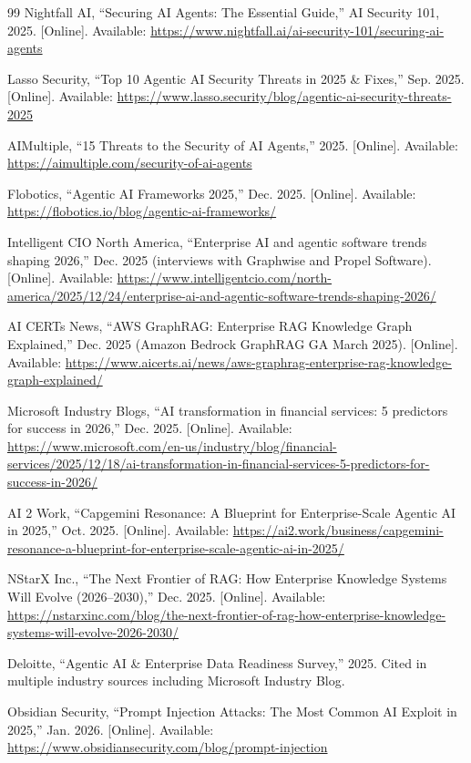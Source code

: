 \documentclass[12pt,a4paper]{article}
\begin{document}
\begin{thebibliography}{99}
Nightfall AI, ``Securing AI Agents: The Essential Guide,'' AI Security 101, 2025. [Online]. Available: \url{https://www.nightfall.ai/ai-security-101/securing-ai-agents}

Lasso Security, ``Top 10 Agentic AI Security Threats in 2025 \& Fixes,'' Sep. 2025. [Online]. Available: \url{https://www.lasso.security/blog/agentic-ai-security-threats-2025}

AIMultiple, ``15 Threats to the Security of AI Agents,'' 2025. [Online]. Available: \url{https://aimultiple.com/security-of-ai-agents}

Flobotics, ``Agentic AI Frameworks 2025,'' Dec. 2025. [Online]. Available: \url{https://flobotics.io/blog/agentic-ai-frameworks/}

Intelligent CIO North America, ``Enterprise AI and agentic software trends shaping 2026,'' Dec. 2025 (interviews with Graphwise and Propel Software). [Online]. Available: \url{https://www.intelligentcio.com/north-america/2025/12/24/enterprise-ai-and-agentic-software-trends-shaping-2026/}

AI CERTs News, ``AWS GraphRAG: Enterprise RAG Knowledge Graph Explained,'' Dec. 2025 (Amazon Bedrock GraphRAG GA March 2025). [Online]. Available: \url{https://www.aicerts.ai/news/aws-graphrag-enterprise-rag-knowledge-graph-explained/}

Microsoft Industry Blogs, ``AI transformation in financial services: 5 predictors for success in 2026,'' Dec. 2025. [Online]. Available: \url{https://www.microsoft.com/en-us/industry/blog/financial-services/2025/12/18/ai-transformation-in-financial-services-5-predictors-for-success-in-2026/}

AI 2 Work, ``Capgemini Resonance: A Blueprint for Enterprise-Scale Agentic AI in 2025,'' Oct. 2025. [Online]. Available: \url{https://ai2.work/business/capgemini-resonance-a-blueprint-for-enterprise-scale-agentic-ai-in-2025/}

NStarX Inc., ``The Next Frontier of RAG: How Enterprise Knowledge Systems Will Evolve (2026--2030),'' Dec. 2025. [Online]. Available: \url{https://nstarxinc.com/blog/the-next-frontier-of-rag-how-enterprise-knowledge-systems-will-evolve-2026-2030/}

Deloitte, ``Agentic AI \& Enterprise Data Readiness Survey,'' 2025. Cited in multiple industry sources including Microsoft Industry Blog.

Obsidian Security, ``Prompt Injection Attacks: The Most Common AI Exploit in 2025,'' Jan. 2026. [Online]. Available: \url{https://www.obsidiansecurity.com/blog/prompt-injection}

\end{thebibliography}
\end{document}
